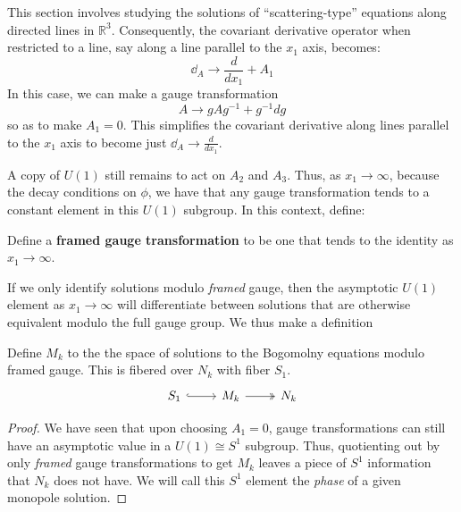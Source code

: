 	This section involves studying the solutions of ``scattering-type'' equations along directed lines in $\mathbb R^3$. Consequently, the covariant derivative operator when restricted to a line, say along a line parallel to the $x_1$ axis, becomes:
	\begin{equation}
		\dd_A \to \frac{d}{dx_1} + A_1
	\end{equation}
	In this case, we can make a gauge transformation
	$$A \to g A g^{-1} + g^{-1} dg$$
	so as to make $A_1 = 0$. This simplifies the covariant derivative along lines parallel to the $x_1$ axis to become just $\dd_A \to \frac{d}{dx_1}$.
	
	A copy of $U(1)$ still remains to act on $A_2$ and $A_3$. Thus, as $x_1 \to \infty$, because the decay conditions on $\phi$, we have that any gauge transformation tends to a constant element in this $U(1)$ subgroup. In this context, define:
	\begin{defn}[Framing]
		Define a \textbf{framed gauge transformation} \cite{hitchin1983, nakajima1993} to be one that tends to the identity as $x_1 \to \infty$.
	\end{defn}
	If we only identify solutions modulo \emph{framed} gauge, then the asymptotic $U(1)$ element as $x_1 \to \infty$ will differentiate between solutions that are otherwise equivalent modulo the full gauge group. We thus make a definition
	\begin{defn}
		Define $M_k$ to the the space of solutions to the Bogomolny equations modulo framed gauge. This is fibered over $N_k$ with fiber $S_1$.
		\[
			\begin{tikzcd}
				S_1 \arrow[r,hookrightarrow] &  M_k \arrow[r,twoheadrightarrow]& N_k
			\end{tikzcd}
		\]
	\end{defn}
	\begin{proof}
		We have seen that upon choosing $A_1 = 0$, gauge transformations can still have an asymptotic value in a $U(1) \cong S^1$ subgroup. Thus, quotienting out by only \emph{framed} gauge transformations to get $M_k$ leaves a piece of $S^1$ information that $N_k$ does not have. We will call this $S^1$ element the \emph{phase} of a given monopole solution. 
	\end{proof}
